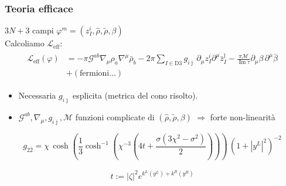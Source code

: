 \documentclass[aspectratio=43,mathserif]{beamer}
\newcommand{\ssn}{\mathcal{N}}
\newcommand{\hatt}[1]{\ensuremath{\widehat{#1}}}
\newcommand{\tildd}[1]{\ensuremath{\widetilde{#1}}}
\renewcommand{\Im}{\ensuremath{\operatorname{Im}}}
\newcommand{\leff}{\ensuremath{\mathcal{L}_\text{eff}}}
\begin{document}
\begin{frame}
	\frametitle{Teoria efficace}
	$3N+3$ campi $\varphi^m = (z_I^i, \hatt\rho, \tildd\rho, \beta)$\\
	\vfill Calcoliamo $\leff$:
	\vspace{10pt}
	\begin{align}
		\begin{split}
			\leff(\varphi) &= - \pi \mathcal{G}^{ab} \nabla_\mu \rho_a \nabla^\mu \bar\rho_b - 2\pi \sum_{I\in \text{D3}} g_{i\bar\jmath}\, \partial_\mu z_I^i \partial^\mu \bar z_I^{\bar\jmath} - \frac{\pi\mathcal{M}}{\Im \tau} \partial_\mu \beta \,\partial^\mu \bar\beta\\
		&+ \left( \text{fermioni}\ldots \right)
	\end{split}
	\end{align}
	\vspace{-10pt}

	\begin{itemize}
		\item Necessaria $g_{i\bar\jmath}$ esplicita (metrica del cono risolto).
		\vfill \item $\mathcal{G}^{ab},\nabla_\mu,g_{i\bar\jmath},\mathcal{M}$ funzioni complicate di $(\hatt\rho,\tildd\rho,\beta)$ $\Longrightarrow$ forte non-linearità
	\end{itemize}



\end{frame}


\begin{frame}

	\begin{equation}
		g_{2\bar 2} = \chi \,\cosh\left( \frac{1}{3} \cosh^{-1} \left( \chi^{-3} \left( 4t + \frac{\sigma(3\chi^2-\sigma^2)}{2} \right) \right) \right) \, (1+ |y^L|^2)^{-2}
		\label{}
	\end{equation}

	\begin{align}
		t := |\zeta|^2 e^{k^L(y^L) + k^R(y^R)}
		\label{}
	\end{align}


\end{frame}
\end{document}

